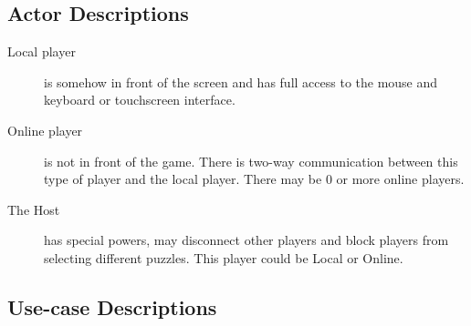 \documentclass[12pt]{article}
\begin{document}
\subsection{Actor Descriptions}
    \begin{description}
        \item[Local player] is somehow in front of the screen and has full
            access to the mouse and keyboard or touchscreen interface.
        \item[Online player] is not in front of the game. There is two-way
            communication between this type of player and the local player.
            There may be 0 or more online players.
        \item[The Host] has special powers, may disconnect other players and
            block players from selecting different puzzles. This player could
            be Local or Online.
    \end{description}

\subsection{Use-case Descriptions}
\end{document}
